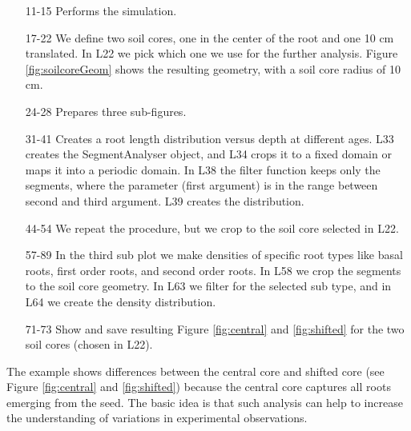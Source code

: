 \begin{itemize}
\item[11-15] Performs the simulation.
\item[17-22] We define two soil cores, one in the center of the root and one 10 cm translated. In L22 we pick which one we use for the further analysis. Figure \ref{fig:soilcoreGeom} shows the resulting geometry, with a soil core radius of 10 cm.
\item[24-28] Prepares three sub-figures. 
\item[31-41] Creates a root length distribution versus depth at different ages. L33 creates the SegmentAnalyser object, and L34 crops it to a fixed domain or maps it into a periodic domain. In L38 the filter function keeps only the segments, where the parameter (first argument) is in the range between second and third argument. L39 creates the distribution. 
\item[44-54] We repeat the procedure, but we crop to the soil core selected in L22. 
\item[57-89] In the third sub plot we make densities of specific root types like basal roots, first order roots, and second order roots. In L58 we crop the segments to the soil core geometry. In L63 we filter for the selected sub type, and in L64 we create the density distribution.
\item[71-73] Show and save resulting Figure \ref{fig:central} and \ref{fig:shifted} for the two soil cores (chosen in L22).
\end{itemize}



The example shows differences between the central core and shifted core (see Figure \ref{fig:central} and \ref{fig:shifted}) because the central core captures all roots emerging from the seed. The basic idea is that such analysis can help to increase the understanding of variations in experimental observations.
% 
% 



